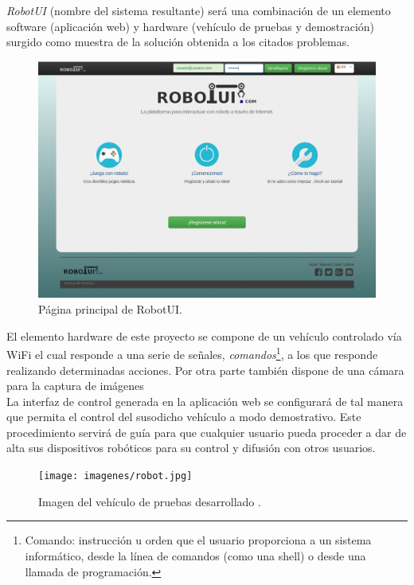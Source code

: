 \emph{RobotUI} (nombre del sistema resultante) será una combinación de un elemento software (aplicación web) y hardware (vehículo de pruebas y demostración) surgido como muestra de la solución obtenida a los citados problemas.\\



\begin{figure}[H]
  \begin{center}
    \includegraphics[scale=0.3]{imagenes/manual-usuario/pagina-principal.png}
  \end{center}
  \label{fig:logo}
 \caption{Página principal de RobotUI.}
\end{figure}


El elemento hardware de este proyecto se compone de un vehículo controlado vía WiFi el cual responde a una serie de señales, \emph{comandos}\footnote{ Comando: instrucción u orden que el usuario proporciona a un sistema informático, 
desde la línea de comandos (como una shell) o desde una llamada de programación.}, a los que responde realizando determinadas acciones. Por otra parte también dispone de una cámara para la captura de imágenes\\

La interfaz de control generada en la aplicación web se configurará de tal manera que permita el control del susodicho vehículo a modo demostrativo. Este procedimiento servirá de guía para que cualquier usuario pueda proceder a dar de alta sus dispositivos 
robóticos para su control y difusión con otros usuarios.\\

\begin{figure}[H]
  \begin{center}
    \texttt{[image: imagenes/robot.jpg]}
  \end{center}
  \label{fig:logo}
 \caption{Imagen del vehículo de pruebas desarrollado \protect\footnotemark.}
\end{figure}

